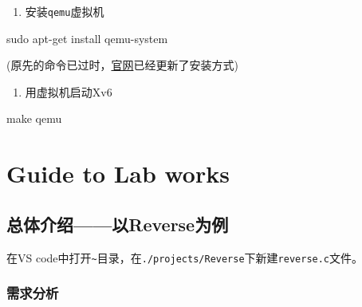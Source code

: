 \documentclass[
]{article}
\newenvironment{Shaded}{}{}
\newcommand{\FunctionTok}[1]{\textcolor[rgb]{0.02,0.16,0.49}{#1}}
\newcommand{\NormalTok}[1]{#1}
\begin{document}
\begin{enumerate}[resume]
  \def\labelenumi{\arabic{enumi}.}
  \item
        安装\texttt{qemu}虚拟机
\end{enumerate}

\begin{Shaded}
  \begin{Highlighting}[]
    \FunctionTok{sudo}\NormalTok{ apt{-}get install qemu{-}system}
  \end{Highlighting}
\end{Shaded}

(原先的命令已过时，\href{https://www.qemu.org/download/\#linux}{官网}已经更新了安装方式)

\begin{enumerate}[resume]
  \def\labelenumi{\arabic{enumi}.}
  \item
        用虚拟机启动Xv6
\end{enumerate}

\begin{Shaded}
  \begin{Highlighting}[]
    \FunctionTok{make}\NormalTok{ qemu}
  \end{Highlighting}
\end{Shaded}

\section{Guide to Lab works}\label{guide-to-lab-works}

\subsection{总体介绍------以Reverse为例}\label{ux603bux4f53ux4ecbux7ecd------ux4ee5reverseux4e3aux4f8b}

在VS
code中打开\texttt{\textasciitilde{}}目录，在\texttt{./projects/Reverse}下新建\texttt{reverse.c}文件。

\subsubsection{需求分析}\label{ux9700ux6c42ux5206ux6790}
\end{document}
